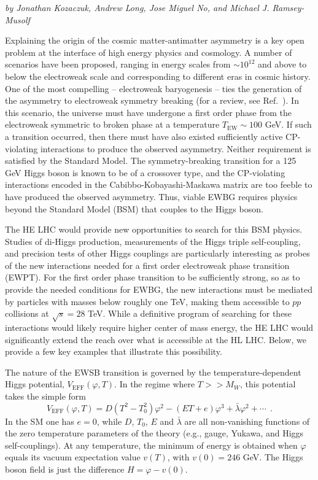 \begin{center}
\textit{by Jonathan Kozaczuk, Andrew Long, Jose Miguel No, and Michael J. Ramsey-Musolf}
\end{center}

 Explaining the origin of the cosmic matter-antimatter asymmetry is a key open problem at the interface of high energy physics and cosmology. A number of scenarios have been proposed, ranging in energy scales from $\sim 10^{12}$ and above to below the electroweak scale and corresponding to different eras in cosmic history. One of the most compelling -- electroweak baryogenesis --  ties the generation of the asymmetry to electroweak symmetry breaking (for a review, see Ref.~\cite{Morrissey:2012db}). In this scenario, the universe must have undergone a first order phase from the electroweak symmetric to broken phase at a temperature $T_\mathrm{EW} \sim 100$ GeV. If such a transition occurred, then there must have also existed sufficiently active CP-violating interactions to produce the observed asymmetry. Neither requirement is satisfied by the Standard Model. The symmetry-breaking transition for a 125 GeV Higgs boson is known to be of a crossover type, and the CP-violating interactions encoded in the Cabibbo-Kobayashi-Maskawa matrix are too feeble to have produced the observed asymmetry. Thus, viable EWBG requires physics beyond the Standard Model (BSM) that couples to the Higgs boson.

The HE LHC would provide new opportunities to search for this BSM physics. Studies of di-Higgs production, measurements of the Higgs triple self-coupling, and precision tests of other Higgs couplings are particularly interesting as probes of the new interactions needed for a first order electroweak phase transition (EWPT). For the first order phase transition to be sufficiently strong, so as to provide the needed conditions for EWBG, the new interactions must be mediated by particles with masses below roughly one TeV, making them accessible to $pp$ collisions at $\sqrt{s} = 28$ TeV. While a definitive program of searching for these interactions would likely require higher center of mass energy, the HE LHC would significantly extend the reach over what is accessible at the HL LHC. Below, we provide a few key examples that illustrate this possibility.

 The nature of the EWSB transition is governed by the temperature-dependent Higgs potential, $V_\mathrm{EFF}(\varphi, T)$. In the regime where $T>> M_W$, this potential takes the 
simple form
\begin{equation}
V_\mathrm{EFF}(\varphi,T) = D(T^2-T_0^2)\varphi^2 -(ET+e)\varphi^3 + {\bar\lambda}\varphi^2+\cdots ~~.
\label{eq:HiggspotT}
\end{equation}
In the SM one has $e=0$, while $D$, $T_0$, $E$ and ${\bar\lambda}$ are all non-vanishing functions of the zero temperature parameters of the theory (e.g., gauge, Yukawa, and Higgs self-couplings). At any temperature, the minimum of energy is obtained when $\varphi$ equals its vacuum expectation value $v(T)$, with $v(0) = 246$ GeV. The Higgs boson field is just the difference $H=\varphi-v(0)$. 

